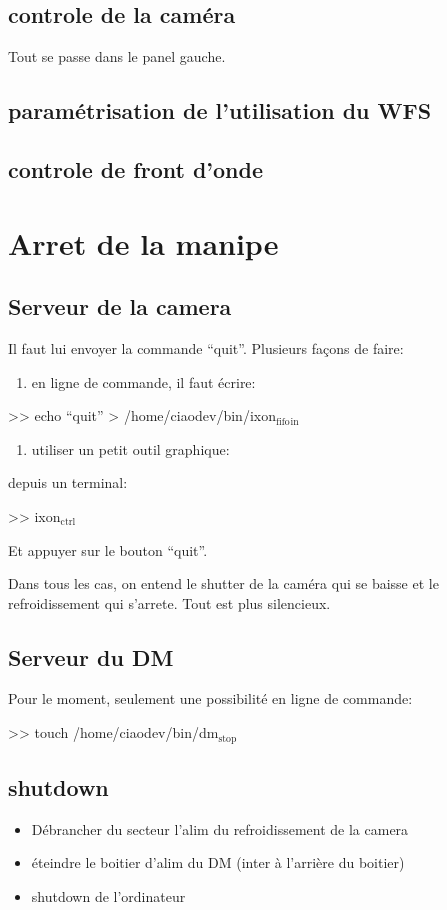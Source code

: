 \documentclass[11pt]{article}
\begin{document}
\subsection{controle de la caméra}
\label{sec-3-1}


Tout se passe dans le panel gauche.
\subsection{paramétrisation de l'utilisation du WFS}
\label{sec-3-2}
\subsection{controle de front d'onde}
\label{sec-3-3}
\section{Arret de la manipe}
\label{sec-4}
\subsection{Serveur de la camera}
\label{sec-4-1}


Il faut lui envoyer la commande ``quit''. Plusieurs façons de faire:

\begin{enumerate}
\item en ligne de commande, il faut écrire:
\end{enumerate}

>> echo ``quit'' > /home/ciaodev/bin/ixon$_{\mathrm{fifo}}$$_{\mathrm{in}}$

\begin{enumerate}
\item utiliser un petit outil graphique:
\end{enumerate}

depuis un terminal:

>> ixon$_{\mathrm{ctrl}}$

Et appuyer sur le bouton ``quit''.

Dans tous les cas, on entend le shutter de la caméra qui se baisse et
le refroidissement qui s'arrete. Tout est plus silencieux.
\subsection{Serveur du DM}
\label{sec-4-2}


Pour le moment, seulement une possibilité en ligne de commande:

>> touch /home/ciaodev/bin/dm$_{\mathrm{stop}}$
\subsection{shutdown}
\label{sec-4-3}

\begin{itemize}
\item Débrancher du secteur l'alim du refroidissement de la camera
\item éteindre le boitier d'alim du DM (inter à l'arrière du boitier)
\item shutdown de l'ordinateur
\end{itemize}
\end{document}
